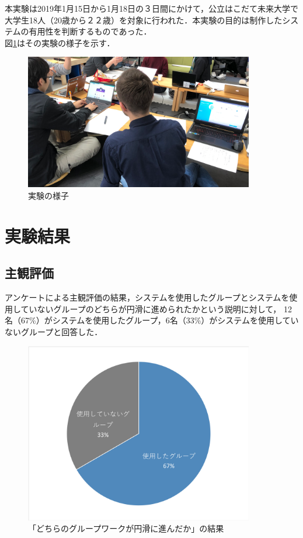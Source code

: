 \documentclass{funthesis}
\begin{document}
本実験は2019年1月15日から1月18日の３日間にかけて，公立はこだて未来大学で大学生18人（20歳から２２歳）を対象に行われた．本実験の目的は制作したシステムの有用性を判断するものであった．\\
図\ref{zikkennyousu}はその実験の様子を示す．

\begin{figure}[H]
 \centering
   \includegraphics[width=100mm]{figures/zikkennyousu.png}
 \caption{実験の様子}
 \label{zikkennyousu}
\end{figure}



\section{実験結果}

\subsection{主観評価}
アンケートによる主観評価の結果，システムを使用したグループとシステムを使用していないグループのどちらが円滑に進められたかという説明に対して，
12名（67\%）がシステムを使用したグループ，6名（33\%）がシステムを使用していないグループと回答した．
\begin{figure}[H]
 \centering
   \includegraphics[width=100mm]{figures/finalExChart3.png}
 \caption{「どちらのグループワークが円滑に進んだか」の結果}
 \label{testtest}
\end{figure}
\end{document}
